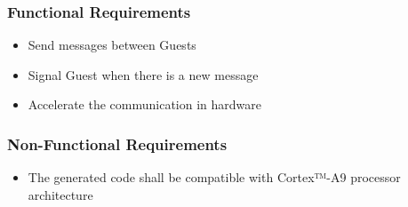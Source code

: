 \subsubsection{Functional Requirements}

\begin{itemize}
	\item Send messages between Guests
	\item Signal Guest when there is a new message
	\item Accelerate the communication in hardware
\end{itemize}

\subsubsection{Non-Functional Requirements}

\begin{itemize}
	\item The generated code shall be compatible with Cortex™-A9 processor architecture
\end{itemize}